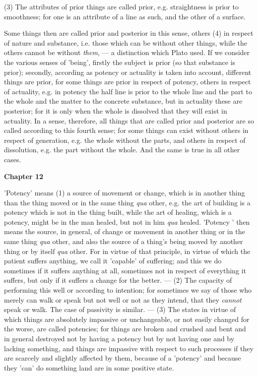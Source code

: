 (3) The attributes of prior things are called prior, e.g. straightness is prior to smoothness; for one is an attribute of a line as such, and the other of a surface.

Some things then are called prior and posterior in this sense, others (4) in respect of nature and substance, i.e. those which can be without other things, while the others cannot be without \emph{them}, — a distinction which Plato used. If we consider
the various senses of 'being', firstly the subject is prior (so that substance is prior); secondly, according as potency or actuality is taken into account, different things are prior, for some things are prior in respect of potency, others in respect of actuality, e.g. in potency the half line is prior to the whole line and the part to the whole and the matter to the concrete substance, but in actuality these are posterior; for it is only when the whole is dissolved that they will exist in actuality. In a sense, therefore, all things that are called prior and posterior are so called according to this fourth sense; for some things can exist without others in respect of generation, e.g. the whole without the parts, and others in respect of dissolution, e.g. the part without the whole. And the same is true in all other cases.

\textbf{Chapter 12}

'Potency' means (1) a source of movement or change, which is in another thing than the thing moved or in the same thing \emph{qua} other, e.g. the art of building is a potency which is not in the thing built, while the art of healing, which is a potency, might be in the man healed, but not in him \emph{qua} healed. 'Potency ' then means the source, in general, of change or movement in another thing or in the same thing \emph{qua} other, and also the source of a thing's being moved by another thing or by itself \emph{qua} other. For in virtue of that principle, in virtue of which the patient suffers anything, we call it 'capable' of suffering; and this we do sometimes if it suffers anything at all, sometimes not in respect of everything it suffers, but only if it suffers a change for the better. — (2) The capacity of performing this well or according to intention; for sometimes we say of those who merely can walk or speak but not well or not as they intend, that they \emph{cannot} speak or walk. The case of passivity is similar. — (3) The states in virtue of which things are absolutely impassive or unchangeable, or not easily changed for the worse, are called potencies; for things are broken and crushed and bent and in general destroyed not by having a potency but by not having one and by lacking something, and things are impassive with respect to such processes if they are scarcely and slightly affected by them, because of a 'potency' and because they 'can' do
something land are in some positive state.

